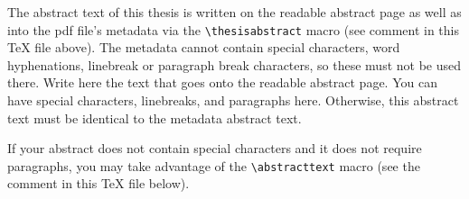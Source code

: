 \documentclass[english, 12pt, a4paper, elec, utf8, a-2b, online]{aaltothesis}
\date{19 February 2026}
\begin{document}
\makecoverpage

\makecopyrightpage

\clearpage

\begin{abstractpage}[english]

  The abstract text of this thesis is written on the readable abstract page as
  well as into the pdf file's metadata via the \verb+\thesisabstract+ macro
  (see comment in this \TeX{} file above). The metadata cannot contain special 
  characters, word hyphenations, linebreak or paragraph break characters, so 
  these must not be used there. Write here the text that goes onto the readable 
  abstract page. You can have special characters, linebreaks, and paragraphs 
  here. Otherwise, this abstract text must be identical to the metadata abstract 
  text.
  
  If your abstract does not contain special characters and it does not require
  paragraphs, you may take advantage of the \verb+\abstracttext+ macro (see the
  comment in this \TeX{} file below).
\end{abstractpage}


\newpage

\newpage
\end{document}
